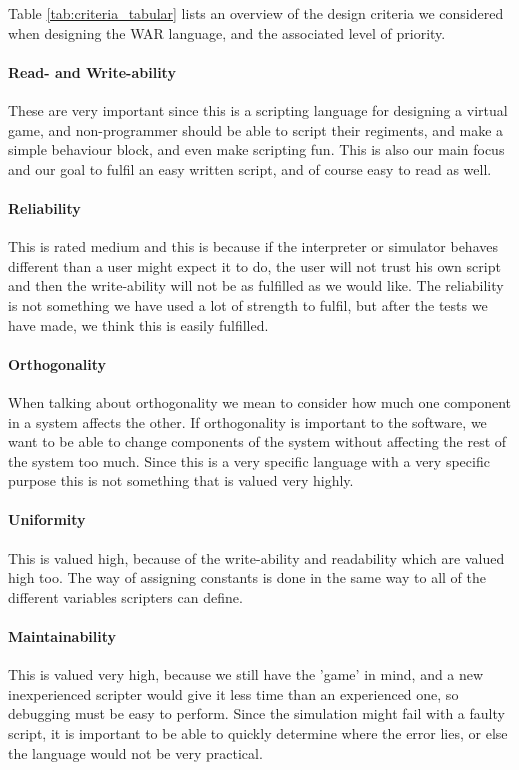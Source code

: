 Table \ref{tab:criteria_tabular} lists an overview of the design criteria we considered when designing the WAR language, and the associated level of priority.

\paragraph{Read- and Write-ability} These are very important since this is a scripting language for designing a virtual game, and non-programmer should be able to script their regiments, and make a simple behaviour block, and even make scripting fun. This is also our main focus and our goal to fulfil an easy written script, and of course easy to read as well.

\paragraph{Reliability} This is rated medium and this is because if the interpreter or simulator behaves different than a user might expect it to do, the user will not trust his own script and then the write-ability will not be as fulfilled as we would like. The reliability is not something we have used a lot of strength to fulfil, but after the tests we have made, we think this is easily fulfilled.

\paragraph{Orthogonality} When talking about orthogonality we mean to consider how much one component in a system affects the other. If orthogonality is important to the software, we want to be able to change components of the system without affecting the rest of the system too much. Since this is a very specific language with a very specific purpose this is not something that is valued very highly.
 
\paragraph{Uniformity} This is valued high, because of the write-ability and readability which are valued high too. The way of assigning constants is done in the same way to all of the different variables scripters can define.


\paragraph{Maintainability} This is valued very high, because we still have the 'game' in mind, and a new inexperienced scripter would give it less time than an experienced one, so debugging must be easy to perform. Since the simulation might fail with a faulty script, it is important to be able to quickly determine where the error lies, or else the language would not be very practical.


